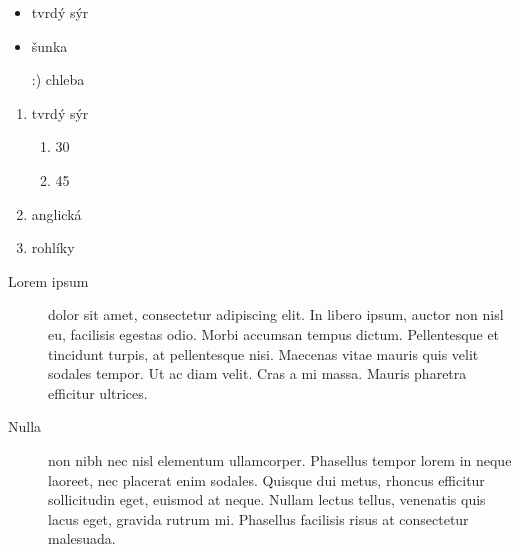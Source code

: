 \documentclass{report}
\begin{document}
	
\begin{itemize}
	\item tvrdý sýr
	\item šunka
	\item[:)] chleba
\end{itemize}

\begin{enumerate}
	\item tvrdý sýr
	\begin{enumerate}
		\item 30%
		\item 45%
	\end{enumerate}
	\item anglická
	\item rohlíky
\end{enumerate}

\begin{description}
	\item[Lorem ipsum] dolor sit amet, consectetur adipiscing elit. In libero ipsum, auctor non nisl eu, facilisis egestas odio. Morbi accumsan tempus dictum. Pellentesque et tincidunt turpis, at pellentesque nisi. Maecenas vitae mauris quis velit sodales tempor. Ut ac diam velit. Cras a mi massa. Mauris pharetra efficitur ultrices.
	\item[Nulla] non nibh nec nisl elementum ullamcorper. Phasellus tempor lorem in neque laoreet, nec placerat enim sodales. Quisque dui metus, rhoncus efficitur sollicitudin eget, euismod at neque. Nullam lectus tellus, venenatis quis lacus eget, gravida rutrum mi. Phasellus facilisis risus at consectetur malesuada.
\end{description}
\end{document}
